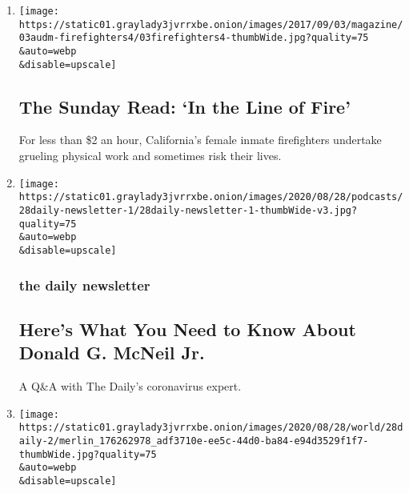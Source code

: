 \begin{enumerate}
\def\labelenumi{\arabic{enumi}.}
\item
  \href{/2020/08/30/podcasts/the-daily/california-wildfires-prisoners.html}{}

  \texttt{[image: https://static01.graylady3jvrrxbe.onion/images/2017/09/03/magazine/03audm-firefighters4/03firefighters4-thumbWide.jpg?quality=75\\\&auto=webp\\\&disable=upscale]}

  \hypertarget{the-sunday-read-in-the-line-of-fire}{%
  \subsection{The Sunday Read: `In the Line of
  Fire'}\label{the-sunday-read-in-the-line-of-fire}}

  For less than \$2 an hour, California's female inmate firefighters
  undertake grueling physical work and sometimes risk their lives.
\item
  \href{/2020/08/28/podcasts/daily-newsletter-coronavirus-donald-trump-convention.html}{}

  \texttt{[image: https://static01.graylady3jvrrxbe.onion/images/2020/08/28/podcasts/28daily-newsletter-1/28daily-newsletter-1-thumbWide-v3.jpg?quality=75\\\&auto=webp\\\&disable=upscale]}

  \hypertarget{the-daily-newsletter-1}{%
  \subsubsection{the daily newsletter}\label{the-daily-newsletter-1}}

  \hypertarget{heres-what-you-need-to-know-about-donald-g-mcneil-jr}{%
  \subsection{Here's What You Need to Know About Donald G. McNeil
  Jr.}\label{heres-what-you-need-to-know-about-donald-g-mcneil-jr}}

  A Q\&A with The Daily's coronavirus expert.
\item
  \href{/2020/08/28/podcasts/the-daily/donald-trump-junior-campaign.html}{}

  \texttt{[image: https://static01.graylady3jvrrxbe.onion/images/2020/08/28/world/28daily-2/merlin\_176262978\_adf3710e-ee5c-44d0-ba84-e94d3529f1f7-thumbWide.jpg?quality=75\\\&auto=webp\\\&disable=upscale]}

  \hypertarget{donald-trump-jrs-journey-to-republican-stardom}{%
}
\end{enumerate}

